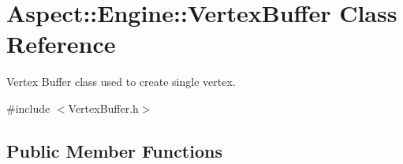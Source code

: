 \hypertarget{class_aspect_1_1_engine_1_1_vertex_buffer}{}\section{Aspect\+:\+:Engine\+:\+:Vertex\+Buffer Class Reference}
\label{class_aspect_1_1_engine_1_1_vertex_buffer}


Vertex Buffer class used to create single vertex.  




{\ttfamily \#include $<$Vertex\+Buffer.\+h$>$}

\subsection*{Public Member Functions}
